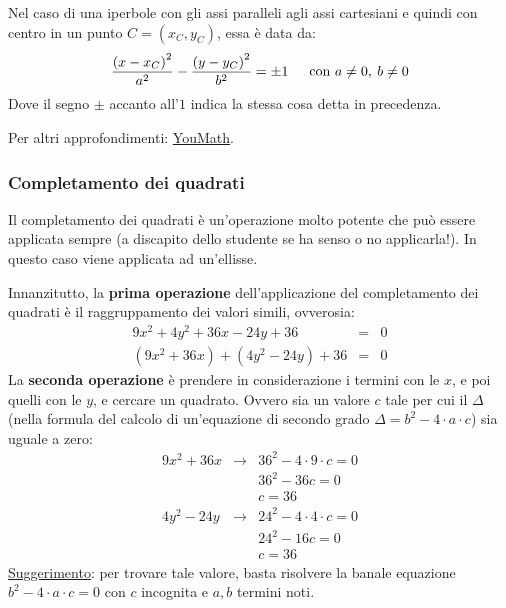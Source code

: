 \documentclass[a4paper]{article}
\begin{document}
	\noindent
	Nel caso di una iperbole con gli assi paralleli agli assi cartesiani e quindi con centro in un punto $C = \left(x_{C}, y_{C}\right)$, essa è data da:
	\begin{equation*}
		\dfrac{\left(x-x_{C}\right)^{2}}{a^{2}} - \dfrac{\left(y-y_{C}\right)^{2}}{b^{2}} = \pm 1 \hspace{1.5em} \text{con } a \ne 0, \: b \ne 0
	\end{equation*}
	Dove il segno $\pm$ accanto all'$1$ indica la stessa cosa detta in precedenza.\newline
	
	\noindent
	Per altri approfondimenti: \href{https://www.youmath.it/domande-a-risposte/view/6096-equazione-iperbole.html}{YouMath}.\newpage
	
	\subsubsection{Completamento dei quadrati}\label{subsubsection: completamento dei quadrati}
	
	Il completamento dei quadrati è un'operazione molto potente che può essere applicata sempre (a discapito dello studente se ha senso o no applicarla!). In questo caso viene applicata ad un'ellisse.\newline
	
	\noindent
	Innanzitutto, la \textbf{prima operazione} dell'applicazione del completamento dei quadrati è il raggruppamento dei valori simili, ovverosia:
	\begin{equation*}
		\begin{array}{rcl}
			9x^{2} + 4y^{2} + 36x - 24y + 36 &=& 0 \\
			\left(9x^{2} + 36x\right) + \left(4y^{2} - 24y\right) + 36 &=& 0
		\end{array}
	\end{equation*}
	La \textbf{seconda operazione} è prendere in considerazione i termini con le $x$, e poi quelli con le $y$, e cercare un quadrato. Ovvero sia un valore $c$ tale per cui il $\Delta$ (nella formula del calcolo di un'equazione di secondo grado $\Delta = b^{2} - 4 \cdot a \cdot c$) sia uguale a zero:
	\begin{equation*}
		\begin{array}{rcl}
			9x^{2} + 36x &\longrightarrow& 36^{2} - 4 \cdot 9 \cdot c = 0 \\
			&& 36^{2} - 36c = 0 \\
			&& c = 36 \\ [1em]
			4y^{2} - 24y &\longrightarrow& 24^{2} - 4 \cdot 4 \cdot c = 0 \\
			&& 24^{2} - 16c = 0 \\
			&& c = 36
		\end{array}
	\end{equation*}
	\underline{Suggerimento}: per trovare tale valore, basta risolvere la banale equazione $b^{2} - 4 \cdot a \cdot c = 0$ con $c$ incognita e $a,b$ termini noti.\newline
	
\end{document}
